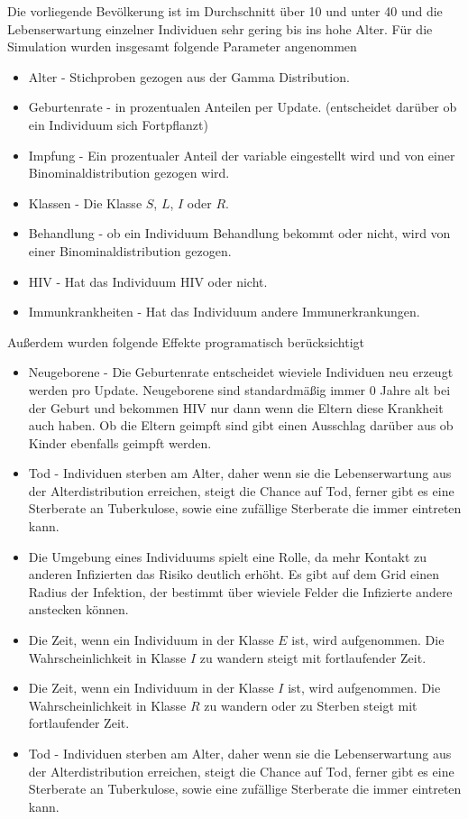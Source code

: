 \documentclass[paper=a4, fontsize=11pt, ngerman, abstract=on]{scrartcl}
\numberwithin{equation}{section} %
\numberwithin{figure}{section} %
\numberwithin{table}{section} %
\begin{document}
Die vorliegende Bevölkerung ist im Durchschnitt über 10 und unter 40 und die Lebenserwartung einzelner Individuen sehr gering bis ins hohe Alter. Für die Simulation wurden insgesamt folgende Parameter angenommen

\begin{itemize}
  \item{Alter - Stichproben gezogen aus der Gamma Distribution.}
  \item{Geburtenrate - in prozentualen Anteilen per Update. (entscheidet darüber ob ein Individuum sich Fortpflanzt)}
  \item{Impfung - Ein prozentualer Anteil der variable eingestellt wird und von einer Binominaldistribution gezogen wird.}
  \item{Klassen - Die Klasse $S$, $L$, $I$ oder $R$.}
  \item{Behandlung - ob ein Individuum Behandlung bekommt oder nicht, wird von einer Binominaldistribution gezogen.}
  \item{HIV - Hat das Individuum HIV oder nicht.}
  \item{Immunkrankheiten - Hat das Individuum andere Immunerkrankungen.}
\end{itemize}

Außerdem wurden folgende Effekte programatisch berücksichtigt

\begin{itemize}
  \item{Neugeborene - Die Geburtenrate entscheidet wieviele Individuen neu erzeugt werden pro Update. Neugeborene sind standardmäßig immer 0 Jahre alt bei der Geburt und bekommen HIV nur dann wenn die Eltern diese Krankheit auch haben. Ob die Eltern geimpft sind gibt einen Ausschlag darüber aus ob Kinder ebenfalls geimpft werden.}
  \item{Tod - Individuen sterben am Alter, daher wenn sie die Lebenserwartung aus der Alterdistribution erreichen, steigt die Chance auf Tod, ferner gibt es eine Sterberate an Tuberkulose, sowie eine zufällige Sterberate die immer eintreten kann.}
  \item{Die Umgebung eines Individuums spielt eine Rolle, da mehr Kontakt zu anderen Infizierten das Risiko deutlich erhöht. Es gibt auf dem Grid einen Radius der Infektion, der bestimmt über wieviele Felder die Infizierte andere anstecken können.}
  \item{Die Zeit, wenn ein Individuum in der Klasse $E$ ist, wird aufgenommen. Die Wahrscheinlichkeit in Klasse $I$ zu wandern steigt mit fortlaufender Zeit.}
  \item{Die Zeit, wenn ein Individuum in der Klasse $I$ ist, wird aufgenommen. Die Wahrscheinlichkeit in Klasse $R$ zu wandern oder zu Sterben steigt mit fortlaufender Zeit.}
  \item{Tod - Individuen sterben am Alter, daher wenn sie die Lebenserwartung aus der Alterdistribution erreichen, steigt die Chance auf Tod, ferner gibt es eine Sterberate an Tuberkulose, sowie eine zufällige Sterberate die immer eintreten kann.}
\end{itemize}
\end{document}
